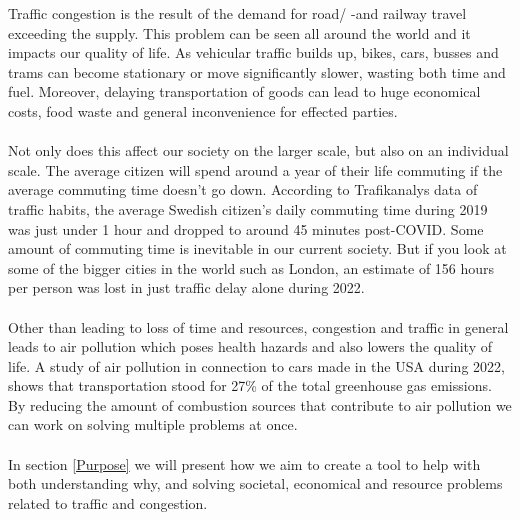 
Traffic congestion is the result of the demand for road/ -and railway travel exceeding the supply. This problem can be seen all around the world\cite{inrix} and it impacts our quality of life. As vehicular traffic builds up, bikes, cars, busses and trams can become stationary or move significantly slower, wasting both time and fuel. Moreover, delaying transportation of goods can lead to huge economical costs, food waste and general inconvenience for effected parties.
\\\\
Not only does this affect our society on the larger scale, but also on an individual scale. The average citizen will spend around a year of their life commuting if the average commuting time doesn't go down. According to Trafikanalys data of traffic habits\cite{trafikanalys_2022}, the average Swedish citizen's daily commuting time during 2019 was just under 1 hour and dropped to around 45 minutes post-COVID. Some amount of commuting time is inevitable in our current society. But if you look at some of the bigger cities in the world such as London, an estimate of 156 hours per person was lost in just traffic delay alone during 2022\cite{inrix}.
\\\\
Other than leading to loss of time and resources, congestion and traffic in general leads to air pollution which poses health hazards and also lowers the quality of life\cite{urban_2004}. A study of air pollution in connection to cars made in the USA during 2022, shows that transportation stood for 27\% of the total greenhouse gas emissions\cite{treehugger_2022}. By reducing the amount of combustion sources that contribute to air pollution we can work on solving multiple problems at once.
\\\\
In section \ref{Purpose} we will present how we aim to create a tool to help with both understanding why, and solving societal, economical and resource problems related to traffic and congestion.
